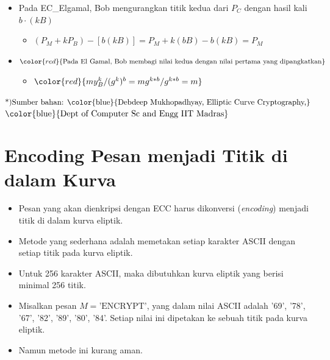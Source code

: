 \documentclass{article}
\begin{document}
\hrulefill

\begin{itemize}
    \item Pada EC\_Elgamal, Bob mengurangkan titik kedua dari $P_C$ dengan hasil kali $b \cdot (kB)$
    \begin{itemize}
        \item $(P_M + kP_B) - [b(kB)] = P_M + k(bB) - b(kB) = P_M$
    \end{itemize}
    
    \item $\color{red}{\text{Pada El Gamal, Bob membagi nilai kedua dengan nilai pertama yang dipangkatkan}}$
    \begin{itemize}
        \item $\color{red}{my_B^k / (g^k)^b = mg^{k*b} / g^{k*b} = m}$
    \end{itemize}
\end{itemize}

\vspace{10mm}

\begin{flushright}
\small $\text{*)} \text{Sumber bahan: } \text{\color{blue}{Debdeep Mukhopadhyay, Elliptic Curve Cryptography,}}$ \\
\small $\text{\color{blue}{Dept of Computer Sc and Engg IIT Madras}}$
\end{flushright}

\newpage


\section*{Encoding Pesan menjadi Titik di dalam Kurva}

\begin{itemize}
    \item Pesan yang akan dienkripsi dengan ECC harus dikonversi (\textit{encoding}) menjadi titik di dalam kurva eliptik.
    \item Metode yang sederhana adalah memetakan setiap karakter ASCII dengan setiap titik pada kurva eliptik.
    \item Untuk 256 karakter ASCII, maka dibutuhkan kurva eliptik yang berisi minimal 256 titik.
    \item Misalkan pesan $M = \text{'ENCRYPT'}$, yang dalam nilai ASCII adalah '69', '78', '67', '82', '89', '80', '84'. Setiap nilai ini dipetakan ke sebuah titik pada kurva eliptik.
    \item Namun metode ini kurang aman.
\end{itemize}
\end{document}
